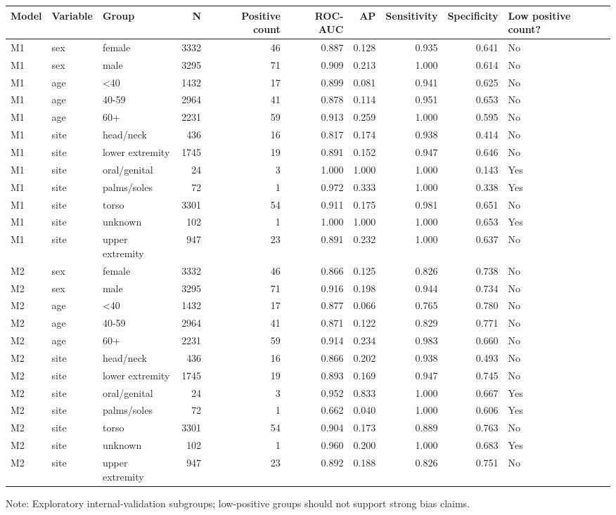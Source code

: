 \begin{table}[t]
\centering
\small
\begin{tabular}{lllrrrrrrl}
\toprule
Model & Variable & Group & N & Positive count & ROC-AUC & AP & Sensitivity & Specificity & Low positive count? \\
\midrule
M1 & sex & female & 3332 & 46 & 0.887 & 0.128 & 0.935 & 0.641 & No \\
M1 & sex & male & 3295 & 71 & 0.909 & 0.213 & 1.000 & 0.614 & No \\
M1 & age & <40 & 1432 & 17 & 0.899 & 0.081 & 0.941 & 0.625 & No \\
M1 & age & 40-59 & 2964 & 41 & 0.878 & 0.114 & 0.951 & 0.653 & No \\
M1 & age & 60+ & 2231 & 59 & 0.913 & 0.259 & 1.000 & 0.595 & No \\
M1 & site & head/neck & 436 & 16 & 0.817 & 0.174 & 0.938 & 0.414 & No \\
M1 & site & lower extremity & 1745 & 19 & 0.891 & 0.152 & 0.947 & 0.646 & No \\
M1 & site & oral/genital & 24 & 3 & 1.000 & 1.000 & 1.000 & 0.143 & Yes \\
M1 & site & palms/soles & 72 & 1 & 0.972 & 0.333 & 1.000 & 0.338 & Yes \\
M1 & site & torso & 3301 & 54 & 0.911 & 0.175 & 0.981 & 0.651 & No \\
M1 & site & unknown & 102 & 1 & 1.000 & 1.000 & 1.000 & 0.653 & Yes \\
M1 & site & upper extremity & 947 & 23 & 0.891 & 0.232 & 1.000 & 0.637 & No \\
M2 & sex & female & 3332 & 46 & 0.866 & 0.125 & 0.826 & 0.738 & No \\
M2 & sex & male & 3295 & 71 & 0.916 & 0.198 & 0.944 & 0.734 & No \\
M2 & age & <40 & 1432 & 17 & 0.877 & 0.066 & 0.765 & 0.780 & No \\
M2 & age & 40-59 & 2964 & 41 & 0.871 & 0.122 & 0.829 & 0.771 & No \\
M2 & age & 60+ & 2231 & 59 & 0.914 & 0.234 & 0.983 & 0.660 & No \\
M2 & site & head/neck & 436 & 16 & 0.866 & 0.202 & 0.938 & 0.493 & No \\
M2 & site & lower extremity & 1745 & 19 & 0.893 & 0.169 & 0.947 & 0.745 & No \\
M2 & site & oral/genital & 24 & 3 & 0.952 & 0.833 & 1.000 & 0.667 & Yes \\
M2 & site & palms/soles & 72 & 1 & 0.662 & 0.040 & 1.000 & 0.606 & Yes \\
M2 & site & torso & 3301 & 54 & 0.904 & 0.173 & 0.889 & 0.763 & No \\
M2 & site & unknown & 102 & 1 & 0.960 & 0.200 & 1.000 & 0.683 & Yes \\
M2 & site & upper extremity & 947 & 23 & 0.892 & 0.188 & 0.826 & 0.751 & No \\
\bottomrule
\end{tabular}
\vspace{2pt}
\parbox{0.98\textwidth}{\footnotesize Note: Exploratory internal-validation subgroups; low-positive groups should not support strong bias claims.}
\end{table}
